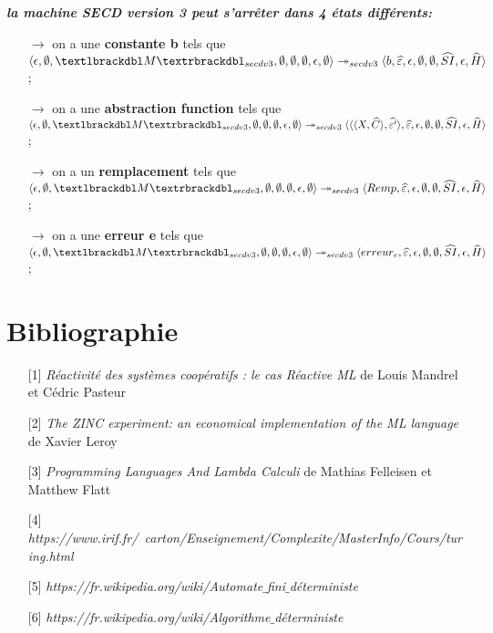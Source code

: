 \documentclass[10pt,a4paper]{article}
\begin{document}
				\textbf{\textit{la machine SECD version 3 peut s'arrêter dans 4 états différents:}}
				\smallbreak
				\begin{itemize}
					\item[]$\longrightarrow$ on a une \textbf{constante b} tels que $\langle \epsilon,\emptyset,\textlbrackdbl M\textrbrackdbl_{secdv3},\emptyset,\emptyset,\emptyset,\epsilon,\emptyset\rangle \twoheadrightarrow_{secdv3} \langle b,\widehat{\varepsilon},\epsilon,\emptyset,\emptyset,\widehat{SI},\epsilon,\widehat{H}\rangle$;
					\item[]
					\item[]$\longrightarrow$ on a une \textbf{abstraction function} tels que $\langle \epsilon,\emptyset,\textlbrackdbl M\textrbrackdbl_{secdv3},\emptyset,\emptyset,\emptyset,\epsilon,\emptyset\rangle \twoheadrightarrow_{secdv3} \langle\langle\langle X,\widehat{C}\rangle,\widehat{\varepsilon'}\rangle,\widehat{\varepsilon},\epsilon,\emptyset,\emptyset,\widehat{SI},\epsilon,\widehat{H}\rangle$;
					\item[]
					\item[]$\longrightarrow$ on a un \textbf{remplacement} tels que $\langle \epsilon,\emptyset,\textlbrackdbl M\textrbrackdbl_{secdv3},\emptyset,\emptyset,\emptyset,\epsilon,\emptyset\rangle \twoheadrightarrow_{secdv3} \langle Remp,\widehat{\varepsilon},\epsilon,\emptyset,\emptyset,\widehat{SI},\epsilon,\widehat{H}\rangle$;
					\item[]
					\item[]$\longrightarrow$ on a une \textbf{erreur e} tels que $\langle \epsilon,\emptyset,\textlbrackdbl M\textrbrackdbl_{secdv3},\emptyset,\emptyset,\emptyset,\epsilon,\emptyset\rangle \twoheadrightarrow_{secdv3} \langle erreur_{e},\widehat{\varepsilon},\epsilon,\emptyset,\emptyset,\widehat{SI},\epsilon,\widehat{H}\rangle$;
				\end{itemize}
		\newpage
		\section{Bibliographie}
			\begin{itemize}
				\item[] [1] \textit{Réactivité des systèmes coopératifs : le cas Réactive ML} de Louis Mandrel et Cédric Pasteur\label{ReactiveML}
				\item[] [2] \textit{The ZINC experiment: an economical implementation of the ML language} de Xavier Leroy\label{ZINC}
				\item[] [3] \textit{Programming Languages And Lambda Calculi} de Mathias Felleisen et Matthew Flatt\label{Calculi}
				\item[] [4] \textit{https://www.irif.fr/~carton/Enseignement/Complexite/MasterInfo/Cours/turing.html}\label{Turing}
				\item[] [5] \textit{https://fr.wikipedia.org/wiki/Automate$\_$fini$\_$déterministe}\label{AFD}
				\item[] [6] \textit{https://fr.wikipedia.org/wiki/Algorithme$\_$déterministe}\label{MFD}
			\end{itemize}
\end{document}
